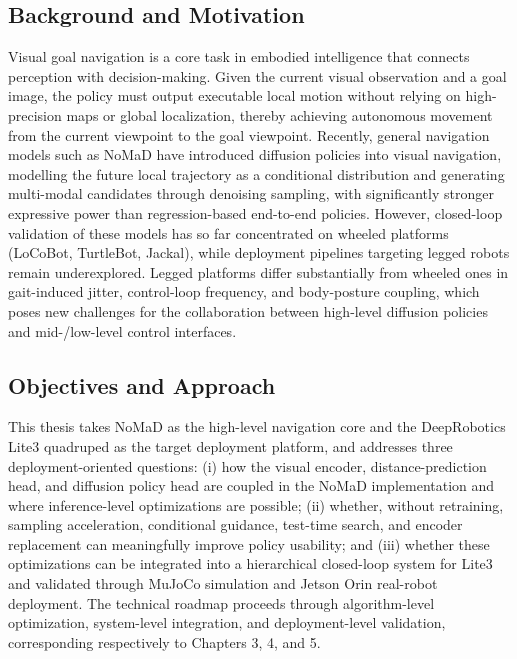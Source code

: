 \begin{digest}[en]

\subsection*{Background and Motivation}

Visual goal navigation is a core task in embodied intelligence that connects perception
with decision-making. Given the current visual observation and a goal image, the policy
must output executable local motion without relying on high-precision maps or global
localization, thereby achieving autonomous movement from the current viewpoint to the
goal viewpoint. Recently, general navigation models such as NoMaD have introduced
diffusion policies into visual navigation, modelling the future local trajectory as a
conditional distribution and generating multi-modal candidates through denoising
sampling, with significantly stronger expressive power than regression-based end-to-end
policies. However, closed-loop validation of these models has so far concentrated on
wheeled platforms (LoCoBot, TurtleBot, Jackal), while deployment pipelines targeting
legged robots remain underexplored. Legged platforms differ substantially from wheeled
ones in gait-induced jitter, control-loop frequency, and body-posture coupling, which
poses new challenges for the collaboration between high-level diffusion policies and
mid-/low-level control interfaces.

\subsection*{Objectives and Approach}

This thesis takes NoMaD as the high-level navigation core and the DeepRobotics Lite3
quadruped as the target deployment platform, and addresses three deployment-oriented
questions: (i) how the visual encoder, distance-prediction head, and diffusion policy
head are coupled in the NoMaD implementation and where inference-level optimizations are
possible; (ii) whether, without retraining, sampling acceleration, conditional guidance,
test-time search, and encoder replacement can meaningfully improve policy usability; and
(iii) whether these optimizations can be integrated into a hierarchical closed-loop
system for Lite3 and validated through MuJoCo simulation and Jetson Orin real-robot
deployment. The technical roadmap proceeds through algorithm-level optimization,
system-level integration, and deployment-level validation, corresponding respectively
to Chapters 3, 4, and 5.


\end{digest}
